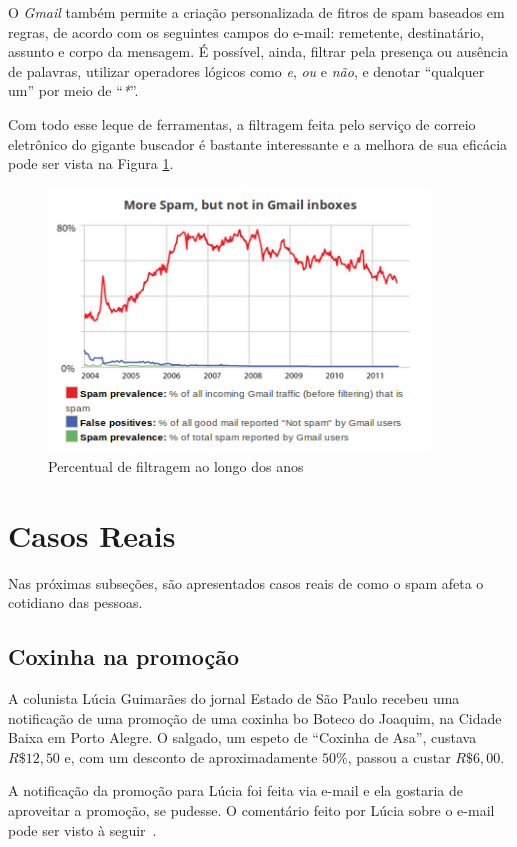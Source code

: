 \documentclass[a4paper,dvipdfm]{article}
\begin{document}
		O \emph{Gmail} também permite a criação personalizada de fitros de spam baseados em regras, de acordo com os seguintes campos do e-mail: remetente, destinatário, assunto e corpo da mensagem. 
		É possível, ainda, filtrar pela presença ou ausência de palavras, utilizar operadores lógicos como \emph{e}, \emph{ou} e \emph{não}, e denotar ``qualquer um'' por meio de ``\emph{*}''.

		Com todo esse leque de ferramentas, a filtragem feita pelo serviço de correio eletrônico do gigante buscador é bastante interessante e a melhora de sua eficácia pode ser vista na Figura \ref{gmail:chart}.

		\begin{figure}[ht]
			\centering
			\includegraphics[height=7cm]{Imagens/gmail/spamchart.png}
			\caption{Percentual de filtragem ao longo dos anos}
			\label{gmail:chart}
		\end{figure}

\newpage
\section{Casos Reais}
	Nas próximas subseções, são apresentados casos reais de como o spam afeta o cotidiano das pessoas.

	\subsection {Coxinha na promoção}
		A colunista Lúcia Guimarães do jornal Estado de São Paulo recebeu uma notificação de uma promoção de uma coxinha bo Boteco do Joaquim, na Cidade Baixa em Porto Alegre.
		O salgado, um espeto de ``Coxinha de Asa'', custava $R\$12,50$ e, com um desconto de aproximadamente $50\%$, passou a custar $R\$6,00$.

		A notificação da promoção para Lúcia foi feita via e-mail e ela gostaria de aproveitar a promoção, se pudesse.
		O comentário feito por Lúcia sobre o e-mail pode ser visto à seguir~\cite{cr:coxinha}.
\end{document}

